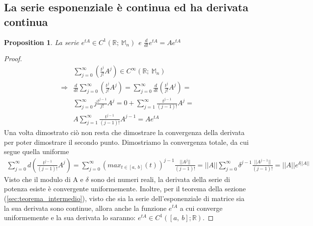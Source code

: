 \documentclass[10pt,a4paper]{article}
\newtheorem{proof}{Proof}
\newtheorem{prop}{Proposition}
\begin{document}
\subsection{La serie esponenziale è continua ed ha derivata continua}
\begin{prop}
	La serie \(e^{tA}\in C^1(\mathbb{R};\ \mathbb{M}_n)\) e \(\frac{d}{dt} e^{tA} = Ae^{tA}\)
\end{prop}
\begin{proof}
	\begin{align*}
		&\sum_{j=0}^{\infty}\left(\frac{t^j}{j!}A^j\right)\in C^{\infty}(\mathbb{R};\ \mathbb{M}_n)\\
		\Rightarrow &\frac{d}{dt}\sum_{j=0}^{\infty}\left(\frac{t^j}{j!}A^j\right) = \sum_{j=0}^{\infty}\frac{d}{dt} \left(\frac{t^j}{j!}A^j\right)=\\
		&\sum_{j=0}^{\infty}j\frac{t^{j-1}}{j!}A^j=0+\sum_{j=1}^{\infty}\frac{t^{j-1}}{(j-1)!}A^j=\\
		&A\sum_{j=1}^{\infty}\frac{t^{j-1}}{(j-1)!}A^{j-1}=Ae^{tA}
	\end{align*}
	Una volta dimostrato ciò non resta che dimostrare la convergenza della derivata per poter dimostrare il secondo punto. Dimostriamo la convergenza totale, da cui segue quella uniforme
	\begin{align*}
		\sum_{j=0}^{\infty}d\left(\frac{t^{j-1}}{(j-1)!}A^j\right)=\sum_{j=0}^{\infty}\left(max_{t\in[a,\ b]}(t)\right)^{j-1}\frac{||A^j||}{(j-1)!}= ||A||\sum_{j=0}^{\infty}\delta^{j-1}\frac{||A^{j-1}||}{(j-1)!}=||A||e^{\delta||A||}
	\end{align*}
Visto che il modulo di A e $\delta$ sono dei numeri reali, la derivata della serie di potenza esiste è convergente uniformemente. Inoltre, per il teorema della sezione (\ref{sec:teorema_intermedio}), visto che sia la serie dell'esponenziale di matrice sia la sua derivata sono continue, allora anche la funzione \(e^{tA}\) a cui converge uniformemente e la sua derivata lo saranno: \(e^{tA}\in C^1([a,\ b]; \mathbb{R})\). 
\end{proof}
\end{document}
